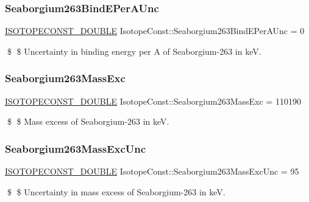 \subsubsection{\texorpdfstring{Seaborgium263\+Bind\+E\+Per\+A\+Unc}{Seaborgium263BindEPerAUnc}}
{\footnotesize\ttfamily \mbox{\hyperlink{group___isotope_const-_macros_ga8f45a7272ce02c0b4c65c44636ed719a}{I\+S\+O\+T\+O\+P\+E\+C\+O\+N\+S\+T\+\_\+\+D\+O\+U\+B\+LE}} Isotope\+Const\+::\+Seaborgium263\+Bind\+E\+Per\+A\+Unc = 0}

\$ \$ Uncertainty in binding energy per A of Seaborgium-\/263 in keV. \mbox{\label{group___isotope_const-_seaborgium-_sg263_ga1a2face47947ec38d4541226420e441a}} 
\subsubsection{\texorpdfstring{Seaborgium263\+Mass\+Exc}{Seaborgium263MassExc}}
{\footnotesize\ttfamily \mbox{\hyperlink{group___isotope_const-_macros_ga8f45a7272ce02c0b4c65c44636ed719a}{I\+S\+O\+T\+O\+P\+E\+C\+O\+N\+S\+T\+\_\+\+D\+O\+U\+B\+LE}} Isotope\+Const\+::\+Seaborgium263\+Mass\+Exc = 110190}

\$ \$ Mass excess of Seaborgium-\/263 in keV. \mbox{\label{group___isotope_const-_seaborgium-_sg263_ga375473c7c0da47076f04ac2f1ca7677d}} 
\subsubsection{\texorpdfstring{Seaborgium263\+Mass\+Exc\+Unc}{Seaborgium263MassExcUnc}}
{\footnotesize\ttfamily \mbox{\hyperlink{group___isotope_const-_macros_ga8f45a7272ce02c0b4c65c44636ed719a}{I\+S\+O\+T\+O\+P\+E\+C\+O\+N\+S\+T\+\_\+\+D\+O\+U\+B\+LE}} Isotope\+Const\+::\+Seaborgium263\+Mass\+Exc\+Unc = 95}

\$ \$ Uncertainty in mass excess of Seaborgium-\/263 in keV. \mbox{\label{group___isotope_const-_seaborgium-_sg263_ga0b83b8768ea72e12f688ed2a7cbbc0df}} 
